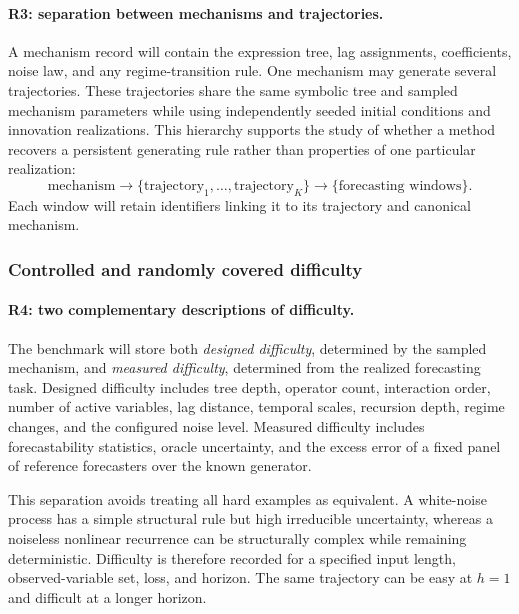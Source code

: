 \paragraph{R3: separation between mechanisms and trajectories.}
A mechanism record will contain the expression tree, lag assignments,
coefficients, noise law, and any regime-transition rule. One mechanism may
generate several trajectories. These trajectories share the same symbolic
tree and sampled mechanism parameters while using independently seeded initial
conditions and innovation realizations. This hierarchy supports the study of
whether a method recovers a persistent generating rule rather than properties
of one particular realization:
\[
\boxed{
\text{mechanism}
\longrightarrow
\{\text{trajectory}_{1},\ldots,\text{trajectory}_{K}\}
\longrightarrow
\{\text{forecasting windows}\}.
}
\]
Each window will retain identifiers linking it to its trajectory and canonical
mechanism.

\subsubsection{Controlled and randomly covered difficulty}

\paragraph{R4: two complementary descriptions of difficulty.}
The benchmark will store both \emph{designed difficulty}, determined by the
sampled mechanism, and \emph{measured difficulty}, determined from the
realized forecasting task. Designed difficulty includes tree depth, operator
count, interaction order, number of active variables, lag distance, temporal
scales, recursion depth, regime changes, and the configured noise level.
Measured difficulty includes forecastability statistics, oracle uncertainty,
and the excess error of a fixed panel of reference forecasters over the known
generator.

This separation avoids treating all hard examples as equivalent. A
white-noise process has a simple structural rule but high irreducible
uncertainty, whereas a noiseless nonlinear recurrence can be structurally
complex while remaining deterministic. Difficulty is therefore recorded for
a specified input length, observed-variable set, loss, and horizon. The same
trajectory can be easy at $h=1$ and difficult at a longer horizon.

